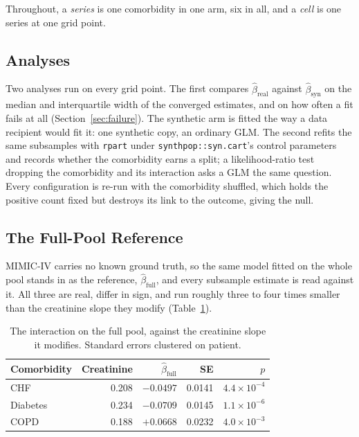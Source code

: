 \documentclass[11pt]{article}
\begin{document}
Throughout, a \emph{series} is one comorbidity in one arm, six in all, and a
\emph{cell} is one series at one grid point.

\subsection{Analyses}
\label{sec:analyses}

Two analyses run on every grid point. The first compares
$\hat\beta_{\text{real}}$ against $\hat\beta_{\text{syn}}$ on the median and
interquartile width of the converged estimates, and on how often a fit fails at
all (Section~\ref{sec:failure}). The synthetic arm is fitted the way a data
recipient would fit it: one synthetic copy, an ordinary GLM.
The second refits the same subsamples with \texttt{rpart} under
\texttt{synthpop::syn.cart}'s control parameters and records whether the
comorbidity earns a split; a likelihood-ratio test dropping the comorbidity and
its interaction asks a GLM the same question. Every configuration is re-run with
the comorbidity shuffled, which holds the positive count fixed but destroys its
link to the outcome, giving the null.

\subsection{The Full-Pool Reference}

MIMIC-IV carries no known ground truth, so the same model fitted on the whole
pool stands in as the reference, $\hat\beta_{\text{full}}$, and every subsample
estimate is read against it. All three are real, differ in sign, and run roughly
three to four times smaller than the creatinine slope they modify
(Table~\ref{tab:fullpool}).

\begin{table}[H]
\centering
\begin{tabular}{lrrrr}
\toprule
Comorbidity & Creatinine & $\hat\beta_{\text{full}}$ & SE & $p$ \\
\midrule
CHF      & 0.208 & $-0.0497$ & 0.0141 & $4.4\times10^{-4}$ \\
Diabetes & 0.234 & $-0.0709$ & 0.0145 & $1.1\times10^{-6}$ \\
COPD     & 0.188 & $+0.0668$ & 0.0232 & $4.0\times10^{-3}$ \\
\bottomrule
\end{tabular}
\caption{The interaction on the full pool, against the creatinine slope it
modifies. Standard errors clustered on patient.}
\label{tab:fullpool}
\end{table}
\end{document}
